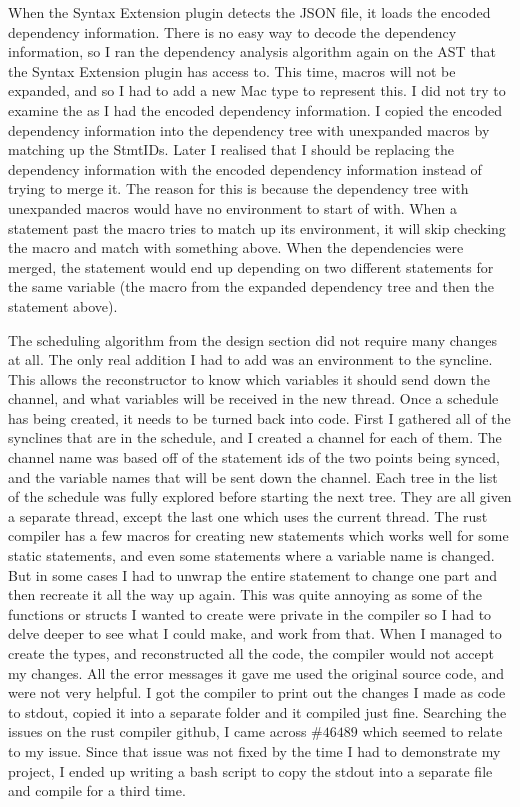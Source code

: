 When the Syntax Extension plugin detects the JSON file, it loads the encoded dependency information. There is no easy way to decode the dependency information, so I ran the dependency analysis algorithm again on the AST that the Syntax Extension plugin has access to. This time, macros will not be expanded, and so I had to add a new Mac type to represent this. I did not try to examine the  as I had the encoded dependency information. I copied the encoded dependency information into the dependency tree with unexpanded macros by matching up the StmtIDs. Later I realised that I should be replacing the dependency information with the encoded dependency information instead of trying to merge it. The reason for this is because the dependency tree with unexpanded macros would have no environment to start of with. When a statement past the macro tries to match up its environment, it will skip checking the macro and match with something above. When the dependencies were merged, the statement would end up depending on two different statements for the same variable (the macro from the expanded dependency tree and then the statement above).

The scheduling algorithm from the design section did not require many changes at all. The only real addition I had to add was an environment to the syncline. This allows the reconstructor to know which variables it should send down the channel, and what variables will be received in the new thread.
Once a schedule has being created, it needs to be turned back into code. First I gathered all of the synclines that are in the schedule, and I created a channel for each of them. The channel name was based off of the statement ids of the two points being synced, and the variable names that will be sent down the channel. Each tree in the list of the schedule was fully explored before starting the next tree. They are all given a separate thread, except the last one which uses the current thread. The rust compiler has a few macros for creating new statements which works well for some static statements, and even some statements where a variable name is changed. But in some cases I had to unwrap the entire statement to change one part and then recreate it all the way up again. This was quite annoying as some of the functions or structs I wanted to create were private in the compiler so I had to delve deeper to see what I could make, and work from that. When I managed to create the types, and reconstructed all the code, the compiler would not accept my changes. All the error messages it gave me used the original source code, and were not very helpful. I got the compiler to print out the changes I made as code to stdout, copied it into a separate folder and it compiled just fine. Searching the issues on the rust compiler github, I came across \href{https://github.com/rust-lang/rust/issues/46489}{$\#46489$} which seemed to relate to my issue. Since that issue was not fixed by the time I had to demonstrate my project, I ended up writing a bash script to copy the stdout into a separate file and compile for a third time.

